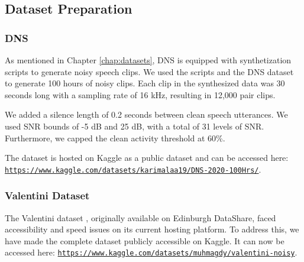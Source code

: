 \subsection{Dataset Preparation}

\subsubsection{DNS}
As mentioned in Chapter \ref{chap:datasets}, DNS \cite{reddy2020} is equipped with synthetization scripts to generate noisy speech clips. We used the scripts and the DNS dataset to generate 100 hours of noisy clips. Each clip in the synthesized data was 30 seconds long with a sampling rate of 16 kHz, resulting in 12,000 pair clips.

We added a silence length of 0.2 seconds between clean speech utterances. We used SNR bounds of -5 dB and 25 dB, with a total of 31 levels of SNR. Furthermore, we capped the clean activity threshold at 60\%.

The dataset is hosted on Kaggle as a public dataset and can be accessed here: \texttt{\url{https://www.kaggle.com/datasets/karimalaa19/DNS-2020-100Hrs/}}.


\subsubsection{Valentini Dataset}
The Valentini dataset \cite{valentini2016}, originally available on Edinburgh DataShare, faced accessibility and speed issues on its current hosting platform. To address this, we have made the complete dataset publicly accessible on Kaggle. It can now be accessed here: \texttt{\url{https://www.kaggle.com/datasets/muhmagdy/valentini-noisy}}.